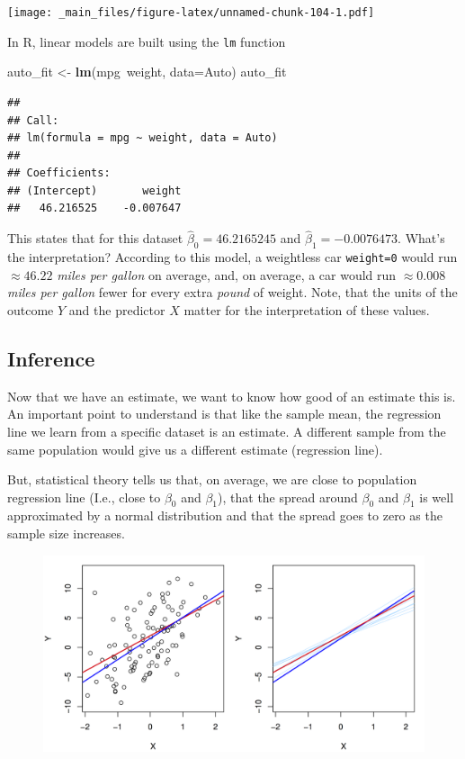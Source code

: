 \documentclass[]{article}
\newenvironment{Shaded}{\begin{snugshade}}{\end{snugshade}}
\newcommand{\KeywordTok}[1]{\textcolor[rgb]{0.13,0.29,0.53}{\textbf{{#1}}}}
\newcommand{\DataTypeTok}[1]{\textcolor[rgb]{0.13,0.29,0.53}{{#1}}}
\newcommand{\StringTok}[1]{\textcolor[rgb]{0.31,0.60,0.02}{{#1}}}
\newcommand{\NormalTok}[1]{{#1}}
\theoremstyle{definition}
\theoremstyle{definition}
\theoremstyle{remark}
\begin{document}
\texttt{[image: \_main\_files/figure-latex/unnamed-chunk-104-1.pdf]}

In R, linear models are built using the \texttt{lm} function

\begin{Shaded}
\begin{Highlighting}[]
\NormalTok{auto_fit <-}\StringTok{ }\KeywordTok{lm}\NormalTok{(mpg~weight, }\DataTypeTok{data=}\NormalTok{Auto)}
\NormalTok{auto_fit}
\end{Highlighting}
\end{Shaded}

\begin{verbatim}
## 
## Call:
## lm(formula = mpg ~ weight, data = Auto)
## 
## Coefficients:
## (Intercept)       weight  
##   46.216525    -0.007647
\end{verbatim}

This states that for this dataset \(\hat{\beta}_0 = 46.2165245\) and
\(\hat{\beta}_1 = -0.0076473\). What's the interpretation? According to
this model, a weightless car \texttt{weight=0} would run
\(\approx 46.22\) \emph{miles per gallon} on average, and, on average, a
car would run \(\approx 0.008\) \emph{miles per gallon} fewer for every
extra \emph{pound} of weight. Note, that the units of the outcome \(Y\)
and the predictor \(X\) matter for the interpretation of these values.

\subsection{Inference}\label{inference}

Now that we have an estimate, we want to know how good of an estimate
this is. An important point to understand is that like the sample mean,
the regression line we learn from a specific dataset is an estimate. A
different sample from the same population would give us a different
estimate (regression line).

But, statistical theory tells us that, on average, we are close to
population regression line (I.e., close to \(\beta_0\) and \(\beta_1\)),
that the spread around \(\beta_0\) and \(\beta_1\) is well approximated
by a normal distribution and that the spread goes to zero as the sample
size increases.

\begin{figure}[htbp]
\centering
\includegraphics{img/population_line.png}
\caption{}
\end{figure}
\end{document}
